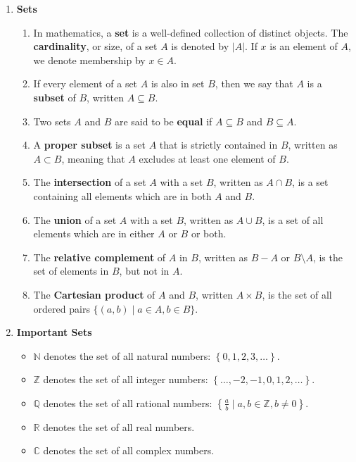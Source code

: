 \documentclass[10pt]{article}
\begin{document}
\date{}
\title{\vspace{-5ex}  \vspace{-5ex}}
\maketitle
\begin{multicols}{2}
\begin{enumerate}
    \item \textbf{Sets} 
    \begin{enumerate}
        \item In mathematics, a \textbf{set} is a well-defined collection of distinct objects. The \textbf{cardinality}, or size, of a set $A$ is denoted by $|A|$. If $x$ is an element of $A$, we denote membership by $x \in A$.
         \item If every element of a set $A$ is also in set $B$, then we say that $A$ is a \textbf{subset} of $B$, written $A \subseteq B$. 
         \item Two sets $A$ and $B$ are said to be \textbf{equal} if $A \subseteq B$ and $B \subseteq A$.
         \item A \textbf{proper subset} is a set $A$ that is strictly contained in $B$, written as $A \subset B$, meaning that $A$ excludes at least one element of $B$. 
         \item The \textbf{intersection} of a set $A$ with a set $B$, written as $A \cap B$, is a set containing all elements which are in both $A$ and $B$. 
         \item The \textbf{union} of a set $A$ with a set $B$, written as $A \cup B$, is a set of all elements which are in either $A$ or $B$ or both. 
         \item The \textbf{relative complement} of $A$ in $B$, written as $B - A$ or $B \setminus A$, is the set of elements in $B$, but not in $A$.
         \item The \textbf{Cartesian product} of $A$ and $B$, written $A \times B$, is the set of all ordered pairs $\{(a,b) \mid a \in A, b \in B \}$.
    \end{enumerate}

    
    \item \textbf{Important Sets} 
    \begin{itemize}
        \item $\mathbb{N}$ denotes the set of all natural numbers: $\left\{0,1,2,3,\hdots \right\}$.
        \item $\mathbb{Z}$ denotes the set of all integer numbers: $\left\{\hdots,-2,-1,0,1,2,\hdots\right\}$. 
        \item $\mathbb{Q}$ denotes the set of all rational numbers: $\left\{ \frac{a}{b} \mid a,b \in \mathbb{Z}, b \neq 0 \right\}$.
        \item $\mathbb{R}$ denotes the set of all real numbers.
        \item $\mathbb{C}$ denotes the set of all complex numbers.
    \end{itemize}
    

\end{enumerate}
\end{multicols}
\end{document}
